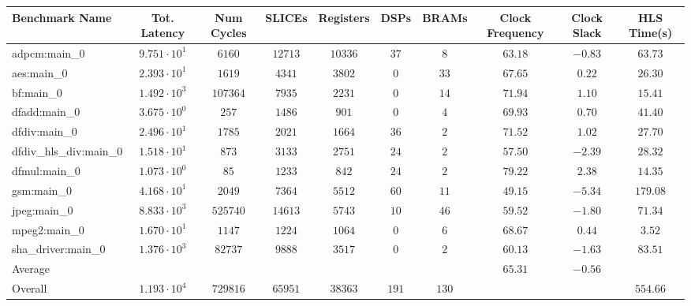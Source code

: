\begin{tabular}{|l|c|c|c|c|c|c|c|c|c|}
\hline
Benchmark Name          & Tot. Latency           & Num Cycles & SLICEs    & Registers & DSPs    & BRAMs   & Clock Frequency & Clock Slack & HLS Time(s) \\
\hline
adpcm:main\_0           & $ 9.751 \cdot 10^{1} $ & $ 6160   $ & $ 12713 $ & $ 10336 $ & $ 37  $ & $ 8   $ & $ 63.18       $ & $ -0.83   $ & $ 63.73   $ \\
aes:main\_0             & $ 2.393 \cdot 10^{1} $ & $ 1619   $ & $ 4341  $ & $ 3802  $ & $ 0   $ & $ 33  $ & $ 67.65       $ & $ 0.22    $ & $ 26.30   $ \\
bf:main\_0              & $ 1.492 \cdot 10^{3} $ & $ 107364 $ & $ 7935  $ & $ 2231  $ & $ 0   $ & $ 14  $ & $ 71.94       $ & $ 1.10    $ & $ 15.41   $ \\
dfadd:main\_0           & $ 3.675 \cdot 10^{0} $ & $ 257    $ & $ 1486  $ & $ 901   $ & $ 0   $ & $ 4   $ & $ 69.93       $ & $ 0.70    $ & $ 41.40   $ \\
dfdiv:main\_0           & $ 2.496 \cdot 10^{1} $ & $ 1785   $ & $ 2021  $ & $ 1664  $ & $ 36  $ & $ 2   $ & $ 71.52       $ & $ 1.02    $ & $ 27.70   $ \\
dfdiv\_hls\_div:main\_0 & $ 1.518 \cdot 10^{1} $ & $ 873    $ & $ 3133  $ & $ 2751  $ & $ 24  $ & $ 2   $ & $ 57.50       $ & $ -2.39   $ & $ 28.32   $ \\
dfmul:main\_0           & $ 1.073 \cdot 10^{0} $ & $ 85     $ & $ 1233  $ & $ 842   $ & $ 24  $ & $ 2   $ & $ 79.22       $ & $ 2.38    $ & $ 14.35   $ \\
gsm:main\_0             & $ 4.168 \cdot 10^{1} $ & $ 2049   $ & $ 7364  $ & $ 5512  $ & $ 60  $ & $ 11  $ & $ 49.15       $ & $ -5.34   $ & $ 179.08  $ \\
jpeg:main\_0            & $ 8.833 \cdot 10^{3} $ & $ 525740 $ & $ 14613 $ & $ 5743  $ & $ 10  $ & $ 46  $ & $ 59.52       $ & $ -1.80   $ & $ 71.34   $ \\
mpeg2:main\_0           & $ 1.670 \cdot 10^{1} $ & $ 1147   $ & $ 1224  $ & $ 1064  $ & $ 0   $ & $ 6   $ & $ 68.67       $ & $ 0.44    $ & $ 3.52    $ \\
sha\_driver:main\_0     & $ 1.376 \cdot 10^{3} $ & $ 82737  $ & $ 9888  $ & $ 3517  $ & $ 0   $ & $ 2   $ & $ 60.13       $ & $ -1.63   $ & $ 83.51   $ \\
\hline
Average                 & $                    $ & $        $ & $       $ & $       $ & $     $ & $     $ & $ 65.31       $ & $ -0.56   $ & $         $ \\
\hline
Overall                 & $ 1.193 \cdot 10^{4} $ & $ 729816 $ & $ 65951 $ & $ 38363 $ & $ 191 $ & $ 130 $ & $             $ & $         $ & $ 554.66  $ \\
\hline
\end{tabular}
